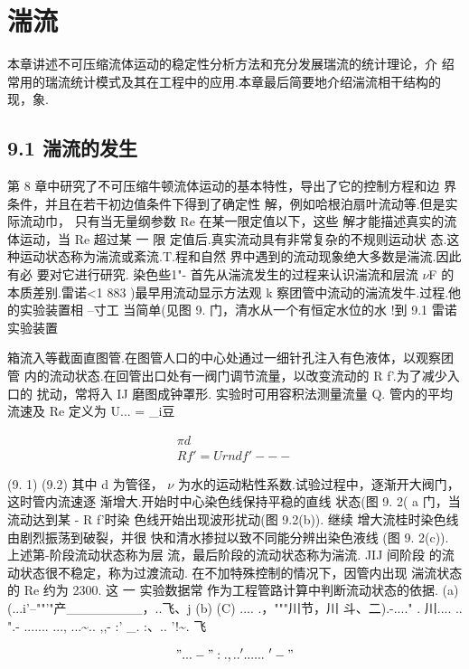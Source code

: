 \chapter{湍流}
本章讲述不可压缩流体运动的稳定性分析方法和充分发展瑞流的统计理论，介 绍常用的瑞流统计模式及其在工程中的应用.本章最后简要地介绍湍流相干结构的 现，象.

\section*{9.1  湍流的发生}

第 8 章中研究了不可压缩牛顿流体运动的基本特性，导出了它的控制方程和边 界条件，并且在若干初边值条件下得到了确定性 解，例如哈根泊扇叶流动等.但是实际流动巾， 只有当无量纲参数 Re 在某一限定值以下，这些 解才能描述真实的流体运动，当 Re 超过某 一 限 定值后.真实流动具有非常复杂的不规则运动状 态.这种运动状态称为湍流或紊流.T.程和自然 界中遇到的流动现象绝大多数是湍流.因此有必 要对它进行研究. 染色些1"- 首先从湍流发生的过程来认识湍流和层流 $\nu$F 的本质差别.雷诺<1 883 )最早用流动显示方法观 k 察团管中流动的湍流发牛.过程.他的实验装置相 --寸工 当简单(见图 9. 门，清水从一个有恒定水位的水 !到 9.1 雷诺实验装置

箱流入等截面直图管.在图管人口的中心处通过一细针孔注入有色液体，以观察团管 内的流动状态.在回管出口处有一阀门调节流量，以改变流动的 R f'.为了减少入口的 扰动，常将入 IJ 磨图成钟罩形. 实验时可用容积法测量流量 Q. 管内的平均流速及 Re 定义为 U... = \_i豆

\begin{gather*}
\pi d ~\\
Rf' = Urnd f'-- -
\end{gather*}

(9. 1) (9.2) 其中 d 为管径， $\nu$ 为水的运动粘性系数.试验过程中，逐渐开大阀门，这时管内流速逐 渐增大.开始时中心染色线保持平稳的直线 状态(图 9. 2( a 门，当流动达到某 - R f'时染 色线开始出现波形扰动(图 9.2(b)). 继续 增大流桂时染色线由剧烈振荡到破裂，并很 快和清水掺挝以致不同能分辨出染色液线 (图 9. 2(c)). 上述第-阶段流动状态称为层 流，最后阶段的流动状态称为湍流. JIJ 间阶段 的流动状态很不稳定，称为过渡流动. 在不加特殊控制的情况下，因管内出现 湍流状态的 Re 约为 2300. 这 一 实验数据常 作为工程管路计算中判断流动状态的依据. (a) (...i'--""'"产\_\_\_\_\_\_\_\_，..飞、j (b) (C) .... .，"""川节，川 斗、二).-...." . 川.... .. ".- ....... ..., ...\textasciitilde{}.. ,,- :' \_. :、.. '!\textasciitilde{}. 飞

\["... -" :. , .. ' ......~'-"\]


